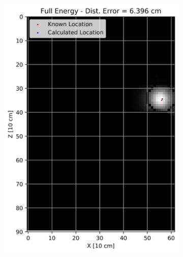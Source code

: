 \begin{figure}[!htb]
\begin{subfigure}[b]{0.15\textwidth}
   \includegraphics[width=1\linewidth]{images/2Cent_Full_2fl_Wall_S}
   \caption{}
   \label{fig:RanF2W}
\end{subfigure}
\begin{subfigure}[b]{0.15\textwidth}
   \centering

\end{subfigure}
\end{figure}
